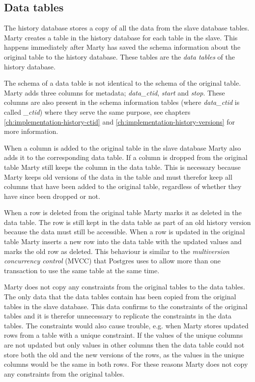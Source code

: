 \subsection{Data tables}
\label{ch:implementation-history-data}
The history database stores a copy of all the data from the slave database tables.
Marty creates a table in the history database for each table in the slave.
This happens immediately after Marty has saved the schema information about the original table to the history database.
These tables are the \textit{data tables} of the history database.

The schema of a data table is not identical to the schema of the original table.
Marty adds three columns for metadata; \textit{data\_ctid}, \textit{start} and \textit{stop}.
These columns are also present in the schema information tables (where \textit{data\_ctid} is called \textit{\_ctid}) where they serve the same purpose, see chapters \ref{ch:implementation-history-ctid} and \ref{ch:implementation-history-versions} for more information.

When a column is added to the original table in the slave database Marty also adds it to the corresponding data table.
If a column is dropped from the original table Marty still keeps the column in the data table.
This is necessary because Marty keeps old versions of the data in the table and must therefor keep all columns that have been added to the original table, regardless of whether they have since been dropped or not.

When a row is deleted from the original table Marty marks it as deleted in the data table.
The row is still kept in the data table as part of an old history version because the data must still be accessible.
When a row is updated in the original table Marty inserts a new row into the data table with the updated values and marks the old row as deleted.
This behaviour is similar to the \textit{multiversion concurrency control} (MVCC) that Postgres uses to allow more than one transaction to use the same table at the same time.

Marty does not copy any constraints from the original tables to the data tables.
The only data that the data tables contain has been copied from the original tables in the slave database.
This data confirms to the constraints of the original tables and it is therefor unnecessary to replicate the constraints in the data tables.
The constraints would also cause trouble, e.g. when Marty stores updated rows from a table with a unique constraint.
If the values of the unique columns are not updated but only values in other columns then the data table could not store both the old and the new versions of the rows, as the values in the unique columns would be the same in both rows.
For these reasons Marty does not copy any constraints from the original tables.

